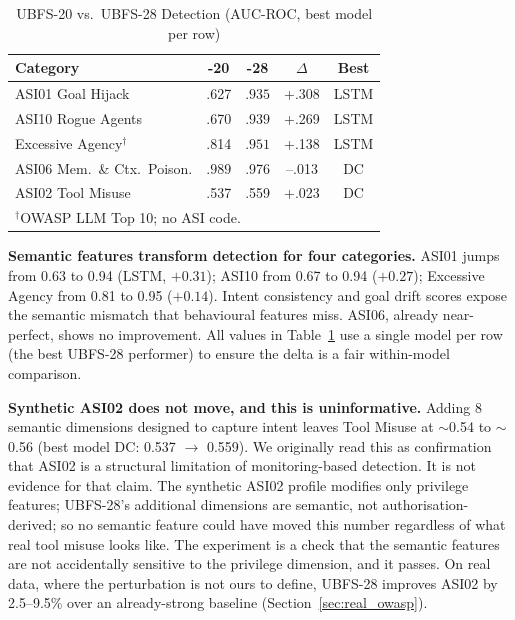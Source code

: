 \documentclass[conference]{IEEEtran}
\begin{document}
\begin{table}[htbp]
\caption{UBFS-20 vs.\ UBFS-28 Detection (AUC-ROC, best model per row)}
\label{tab:hybrid}
\centering
\small
\begin{tabular}{@{}lcccc@{}}
\toprule
\textbf{Category} & \textbf{-20} & \textbf{-28} & \textbf{$\Delta$} & \textbf{Best} \\
\midrule
ASI01 Goal Hijack & .627 & $\mathbf{.935}$ & +.308 & LSTM \\
ASI10 Rogue Agents & .670 & $\mathbf{.939}$ & +.269 & LSTM \\
Excessive Agency$^{\dagger}$ & .814 & $\mathbf{.951}$ & +.138 & LSTM \\
ASI06 Mem.\ \& Ctx.\ Poison. & $\mathbf{.989}$ & .976 & --.013 & DC \\
\addlinespace
ASI02 Tool Misuse & .537 & .559 & +.023 & DC \\
\bottomrule
\multicolumn{5}{l}{\footnotesize $^{\dagger}$OWASP LLM Top 10; no ASI code.} \\
\end{tabular}
\end{table}

\textbf{Semantic features transform detection for four categories.} ASI01 jumps from 0.63 to 0.94 (LSTM, $+0.31$); ASI10 from 0.67 to 0.94 ($+0.27$); Excessive Agency from 0.81 to 0.95 ($+0.14$). Intent consistency and goal drift scores expose the semantic mismatch that behavioural features miss. ASI06, already near-perfect, shows no improvement. All values in Table~\ref{tab:hybrid} use a single model per row (the best UBFS-28 performer) to ensure the delta is a fair within-model comparison.

\textbf{Synthetic ASI02 does not move, and this is uninformative.} Adding 8 semantic dimensions designed to capture intent leaves Tool Misuse at ${\sim}$0.54 to ${\sim}$0.56 (best model DC: 0.537 $\to$ 0.559). We originally read this as confirmation that ASI02 is a structural limitation of monitoring-based detection. It is not evidence for that claim. The synthetic ASI02 profile modifies only privilege features; UBFS-28's additional dimensions are semantic, not authorisation-derived; so no semantic feature could have moved this number regardless of what real tool misuse looks like. The experiment is a check that the semantic features are not accidentally sensitive to the privilege dimension, and it passes. On real data, where the perturbation is not ours to define, UBFS-28 improves ASI02 by 2.5--9.5\% over an already-strong baseline (Section~\ref{sec:real_owasp}).
\end{document}
